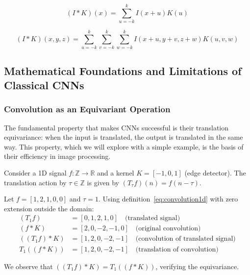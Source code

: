 \begin{equation}
    (I * K)(x) = \sum_{u=-k}^{k} I(x+u)K(u)
    \label{eq:convolution1d}
\end{equation}

\begin{equation}
    (I * K)(x,y,z) = \sum_{u=-k}^{k}\sum_{v=-k}^{k}\sum_{w=-k}^{k} I(x+u, y+v, z+w)K(u,v,w)
    \label{eq:convolution3d}
\end{equation}

\subsection{Mathematical Foundations and Limitations of Classical CNNs}\label{subsec:fundamentos_limitaciones_cnn}

\subsubsection{Convolution as an Equivariant Operation}\label{subsubsec:convolucion_equivariante}

The fundamental property that makes \glspl{CNN} successful is their translation equivariance: when the input is translated, the output is translated in the same way. This property, which we will explore with a simple example, is the basis of their efficiency in image processing.

\begin{example}\label{ex:equivarianza_traslaciones_1d}
Consider a 1D signal $f: \mathbb{Z} \to \mathbb{R}$ and a kernel $K = [-1, 0, 1]$ (edge detector).
The translation action by $\tau \in \mathbb{Z}$ is given by $(T_\tau f)(n) = f(n-\tau)$.

Let $f = [1, 2, 1, 0, 0]$ and $\tau = 1$. Using definition~\eqref{eq:convolution1d} with zero extension outside the domain:
\begin{align}
(T_1 f) &= [0, 1, 2, 1, 0] \quad \text{(translated signal)} \\
(f * K) &= [2, 0, -2, -1, 0] \quad \text{(original convolution)} \\
((T_1 f) * K) &= [1, 2, 0, -2, -1] \quad \text{(convolution of translated signal)} \\
T_1((f * K)) &= [1, 2, 0, -2, -1] \quad \text{(translation of convolution)}
\end{align}

We observe that $((T_1 f) * K) = T_1((f * K))$, verifying the equivariance.
\end{example}

